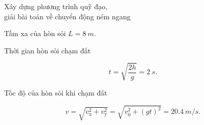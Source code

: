 \begin{dang}{Xây dựng phương trình quỹ đạo, \\giải bài toán về chuyển động ném ngang}
{{\begin{enumerate}[label=\alph*.]
			Tầm xa của hòn sỏi $L =\SI{8}{m}.$
			
			Thời gian hòn sỏi chạm đất
			
			$$t=\sqrt{\dfrac{2h}{g}} = \SI{2}{s}.$$
			
			Tốc độ của hòn sỏi khi chạm đất 
			
			$$v=\sqrt{v^2_{\text{x}} + v^2_{\text{y}}} = \sqrt{v^2_0+ (gt)^2} = \SI{20,4}{m/s}.$$
		\end{enumerate}
	}}
\end{dang}